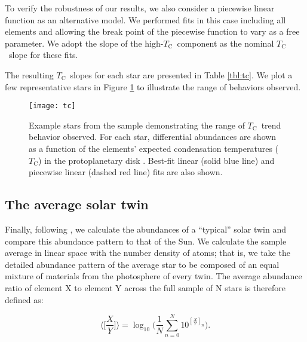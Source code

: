 \documentclass[twocolumn]{aastex62}
\newcommand{\tc}{$T_\mathrm{C}$}
\begin{document}
To verify the robustness of our results, we also consider a piecewise linear function as an alternative model. We performed fits in this case including all elements and allowing the break point of the piecewise function to vary as a free parameter. We adopt the slope of the high-\tc\ component as the nominal \tc\ slope for these fits. 

The resulting \tc\ slopes for each star are presented in Table \ref{tbl:tc}. We plot a few representative stars in Figure \ref{fig:tc} to illustrate the range of behaviors observed.

\begin{figure}
\centering
\texttt{[image: tc]}
\caption{Example stars from the sample demonstrating the range of \tc\ trend behavior observed. For each star, differential abundances are shown as a function of the elements' expected condensation temperatures (\tc) in the protoplanetary disk \citep{lodders03}. Best-fit linear (solid blue line) and piecewise linear (dashed red line) fits are also shown.}
\label{fig:tc}
\end{figure}

\subsection{The average solar twin}

Finally, following \citet{melendez09}, we calculate the abundances of a ``typical'' solar twin and compare this abundance pattern to that of the Sun. We calculate the sample average in linear space with the number density of atoms; that is, we take the detailed abundance pattern of the average star to be composed of an equal mixture of materials from the photosphere of every twin. The average abundance ratio of element X to element Y across the full sample of N stars is therefore defined as:

\begin{equation}
 \Big \langle \Big[ \frac{X}{Y} \Big] \Big \rangle = \log_{10} \Big( \frac{1}{N} \sum_{n=0}^{N} 10^{[\frac{X}{Y}]_n} \Big) .
\end{equation}
\end{document}
